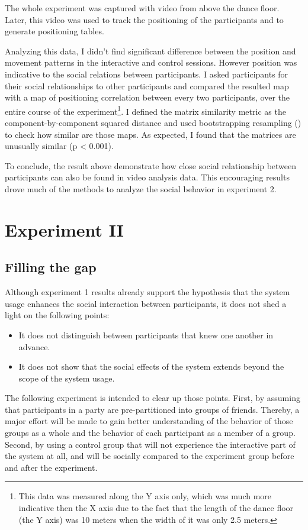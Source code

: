 \documentclass[a4paper,11pt]{article}
\begin{document}
{The whole experiment was captured with video from above the dance floor.
Later, this video was used to track the positioning of the participants and to generate positioning tables.

Analyzing this data, I didn't find significant difference between the position and movement patterns in the interactive and control sessions.
However position was indicative to the social relations between participants.
I asked participants for their social relationships to other participants and compared the resulted map with a map of positioning correlation between every two participants, over the entire course of the experiment\footnote{This data was measured along the Y axis only, which was much more indicative then the X axis due to the fact that the length of the dance floor (the Y axis) was 10 meters when the width of it was only 2.5 meters.}.
I defined the matrix similarity metric as the component-by-component squared distance and used bootstrapping resampling (\cite{good2006permutation}) to check how similar are those maps.
As expected, I found that the matrices are unusually similar (p \textless{} 0.001).

To conclude, the result above demonstrate how close social relationship between participants can also be found in video analysis data.
This encouraging results drove much of the methods to analyze the social behavior in experiment 2.

\section{Experiment II}

\subsection{Filling the gap}

Although experiment 1 results already support the hypothesis that the system usage enhances the social interaction between participants, it does not shed a light on the following points:

\begin{itemize}
	\item It does not distinguish between participants that knew one another in advance.
	\item It does not show that the social effects of the system extends beyond the scope of the system usage.
\end{itemize}

The following experiment is intended to clear up those points.
First, by assuming that participants in a party are pre-partitioned into groups of friends.
Thereby, a major effort will be made to gain better understanding of the behavior of those groups as a whole and the behavior of each participant as a member of a group.
Second, by using a control group that will not experience the interactive part of the system at all, and will be socially compared to the experiment group before and after the experiment.

}
\end{document}
